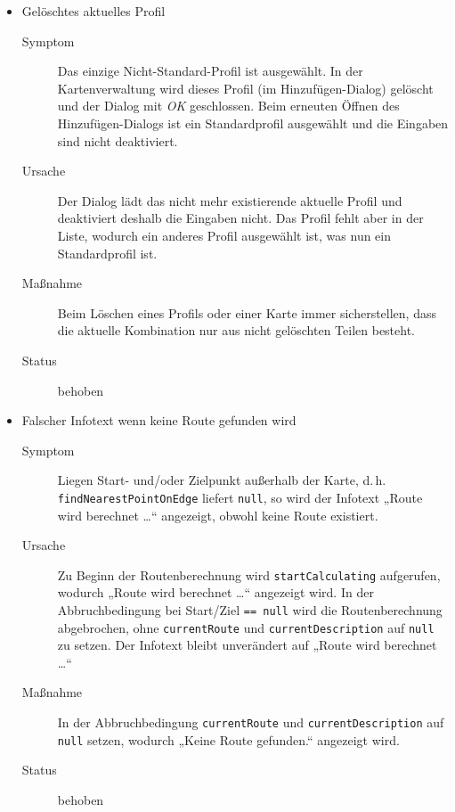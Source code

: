 \documentclass[a4paper, 11pt]{article}
\makeatletter
\def\namedlabel#1#2{\begingroup
    #2%
    \def\@currentlabel{#2}%
    \phantomsection\label{#1}\endgroup
}
\newcommand{\oitem}[2]{
  \@ifundefined{c@oitem#1}{\newcounter{oitem#1}}{} %
  \addtocounter{oitem#1}{10}
  \item[\namedlabel{#1:#2}{/#1\arabic{oitem#1}/}]
}
\newcommand{\bug}[6]{%
  \oitem{BG}{#1}
  	#2
    \begin{description}
    \item[Symptom] #3
    \item[Ursache] #4
    \item[Maßnahme] #5
    \item[Status] #6
    \end{description}
}
\newcommand{\code}[1]{\texttt{#1}}
\makeatother
\begin{document}
\begin{itemize}
{    Das Profil ist weiterhin in der Liste der Karte vorhanden.}
    {Beim Beenden des Dialogs werden gelöschte Profile nicht richtig erkannt und verarbeitet.}
    {Weiteren Code hinzufügen, der alle gelöschten Profile ermittelt und sie direkt aus den Listen löscht.}
    {behoben}
\bug{currentProfileNotExisting}{Gelöschtes aktuelles Profil}
    {Das einzige Nicht-Standard-Profil ist ausgewählt. In der Kartenverwaltung wird dieses Profil (im Hinzufügen-Dialog) gelöscht und der Dialog mit \textit{OK} geschlossen.
    Beim erneuten Öffnen des Hinzufügen-Dialogs ist ein Standardprofil ausgewählt und die Eingaben sind nicht deaktiviert.}
    {Der Dialog lädt das nicht mehr existierende aktuelle Profil und deaktiviert deshalb die Eingaben nicht.
    Das Profil fehlt aber in der Liste, wodurch ein anderes Profil ausgewählt ist, was nun ein Standardprofil ist.}
    {Beim Löschen eines Profils oder einer Karte immer sicherstellen, dass die aktuelle Kombination nur aus nicht gelöschten Teilen besteht.}
    {behoben}
\bug{noRouteWirdBerechnet}{Falscher Infotext wenn keine Route gefunden wird}
	{Liegen Start- und/oder Zielpunkt außerhalb der Karte,
	d.\,h. \code{find\-Nearest\-Point\-On\-Edge} liefert \code{null},
	so wird der Infotext „Route wird berechnet \dots“ angezeigt, obwohl keine Route existiert.}
	{Zu Beginn der Routenberechnung wird \code{startCalculating} aufgerufen, wodurch „Route wird berechnet \dots“ angezeigt wird.
	In der Abbruchbedingung bei Start/Ziel \code{== null} wird die Routenberechnung abgebrochen,
	ohne \code{currentRoute} und \code{currentDescription} auf \code{null} zu setzen.
	Der Infotext bleibt unverändert auf „Route wird berechnet \dots“}
	{In der Abbruchbedingung \code{currentRoute} und \code{currentDescription} auf \code{null} setzen, wodurch „Keine Route gefunden.“ angezeigt wird.}
	{behoben}
\end{itemize}
\end{document}
